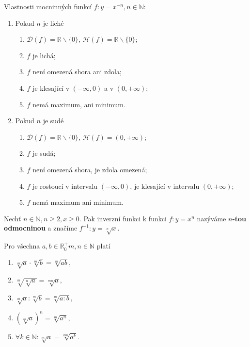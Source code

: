 \begin{veta}
  Vlastnosti mocninných funkcí $f\colon y= x^{-n}, n \in \mathbb N$:
  \begin{enumerate}[1.]
    \item Pokud $n$ je liché
    \begin{enumerate}[$i.$]
      \item $\mathcal D(f)= \mathbb R \smallsetminus \{ 0\}$, $\mathcal H(f)= \mathbb R \smallsetminus \{ 0 \}$;
      \item $f$ je lichá;
      \item $f$ není omezená shora ani zdola;
      \item $f$ je klesající v $( -\infty,0)$ a v $( 0,+\infty )$;
      \item $f$ nemá maximum, ani minimum.
    \end{enumerate}
    \item Pokud $n$ je sudé
    \begin{enumerate}[$i.$]
      \item $\mathcal D(f)= \mathbb R \smallsetminus \{ 0\}$, $\mathcal H(f)= ( 0,+\infty )$;
      \item $f$ je sudá;
      \item $f$ není omezená shora, je zdola omezená;
      \item $f$ je rostoucí v intervalu $( -\infty,0 ) $, je klesající v intervalu $( 0,+\infty )$;
      \item $f$ nemá maximum ani minimum.
    \end{enumerate}
  \end{enumerate}
\end{veta}

\begin{definition}
    Nechť $n\in \mathbb N, n\geq 2, x \geq 0.$ Pak inverzní funkci k funkci
    $f\colon y=x^n$ nazýváme \textbf{$n$-tou odmocninou} a značíme $f^{-1}\colon y=\sqrt[n]{x}.$
\end{definition}

\begin{veta}
    Pro všechna $a,b \in \mathbb R_0^+ m,n \in \mathbb N$ platí
    \begin{enumerate}[$i.$]
        \item $\sqrt[m]{a}\cdot \sqrt[m]{b}=\sqrt[m]{ab},$
       	\item $\sqrt[m]{\sqrt[n]{a} } = \sqrt[mn]{a},$
       	\item $\sqrt[m]{a} :\sqrt[m]{b} = \sqrt[m]{a:b},$
       	\item $\left ( \sqrt[m]{a}  \right )^n = \sqrt[m]{a^n},$
       	\item $\forall k \in \mathbb N\colon \sqrt[m]{a}=\sqrt[km]{a^k}.$
    \end{enumerate}
\end{veta}

